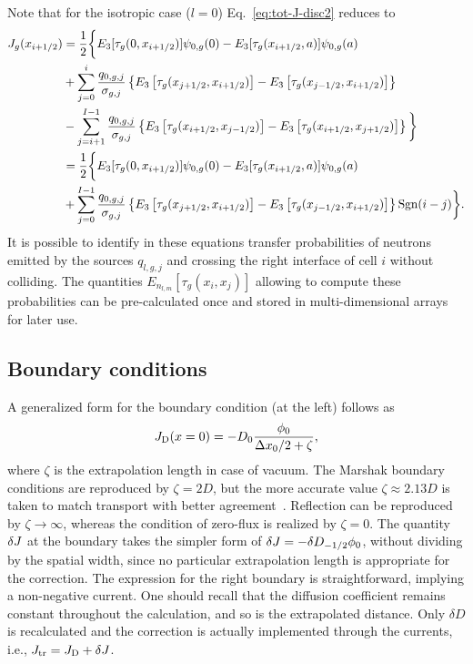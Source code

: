 Note that for the isotropic case ($l=0$) Eq.~\eqref{eq:tot-J-disc2} reduces to
\begin{equation}\label{eq:tot-J-disc2-l=0}
\begin{split}
J_g(x_{i+1/2}) &= \frac{1}{2}
\bigg\{
E_3[\tau_g(0,x_{i+1/2})] \psi_{0,g}(0) 
- E_3[\tau_g(x_{i+1/2},a)]\psi_{0,g}(a) \\
&+
\sum\limits_{j=0}^i \frac{q_{0,g,j}}{\sigma_{g,j}} 
\left\{
E_3\left[
\tau_g(x_{j+1/2},x_{i+1/2}) \right] 
- E_3\left[
\tau_g(x_{j-1/2},x_{i+1/2})
\right] 
\right\} \\
&-
\sum\limits_{j=i+1}^{I-1} \frac{q_{0,g,j}}{\sigma_{g,j}} 
\left\{
E_3\left[
\tau_g(x_{i+1/2},x_{j-1/2}) \right] 
- E_3\left[
\tau_g(x_{i+1/2},x_{j+1/2})
\right]
\right\}
\bigg\}	\\
&=\frac{1}{2}
\bigg\{
E_3[\tau_g(0,x_{i+1/2})] \psi_{0,g}(0) 
- E_3[\tau_g(x_{i+1/2},a)]\psi_{0,g}(a) \\
&+
\sum\limits_{j=0}^{I-1} \frac{q_{0,g,j}}{\sigma_{g,j}} 
\left\{
E_3\left[
\tau_g(x_{j+1/2},x_{i+1/2}) \right] 
- E_3\left[
\tau_g(x_{j-1/2},x_{i+1/2})
\right] 
\right\}\operatorname{Sgn}(i-j)
\bigg\}. 
\end{split}
\end{equation}
It is possible to identify in these equations transfer probabilities of neutrons emitted by the sources $q_{l,g,j}$ and crossing the right interface of cell $i$ without colliding. The quantities $E_{n_{l,m}}[\tau_g(x_i,x_j)]$ allowing to compute these probabilities can be pre-calculated once and stored in multi-dimensional arrays for later use.

%
\subsection{Boundary conditions}
\label{sec:BC}
A generalized form for the boundary condition (at the left) follows as
\begin{equation}\label{eq:BC}
J_{\textrm{\scriptsize{D}}}(x=0) = -D_0\frac{\phi_0}{\Delta x_0/2 + \zeta},
\end{equation} 
where $\zeta$ is the extrapolation length in case of vacuum. The Marshak boundary conditions are reproduced by $\zeta=2D$, but the more accurate value $\zeta\approx 2.13D$ is taken to match transport with better agreement~\cite{Lamarsh-1966}. Reflection can be reproduced by $\zeta\rightarrow\infty$, whereas the condition of zero-flux is realized by $\zeta=0$. 
%
The quantity $\delta J$ at the boundary takes the simpler form of $\delta J = -\delta D_{-1/2}\phi_0$, without dividing by the spatial width, since no particular extrapolation length is appropriate for the correction. The expression for the right boundary is straightforward, implying a non-negative current. One should recall that the diffusion coefficient remains constant throughout the calculation, and so is the extrapolated distance. Only $\delta D$ is recalculated and the correction is actually implemented through the currents, i.e., $J_{\textrm{\scriptsize{tr}}} = J_{\textrm{\scriptsize{D}}} + \delta J$.

